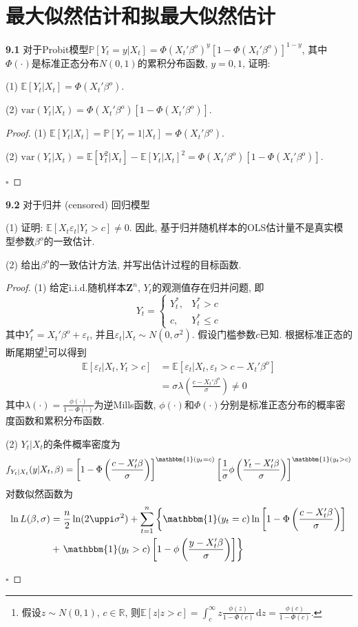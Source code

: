 \documentclass[cn,12pt,math=mtpro2,citestyle=gb7714-2015,bibstyle=gb7714-2015,twocol,mode=simple]{elegantbook}
\newcommand{\R}{\mathbb{R}}
\newcommand{\PP}{\mathbb{P}}
\newcommand{\E}{\mathbb{E}}
\newcommand{\var}{\text{var}}
\begin{document}
\chapter*{最大似然估计和拟最大似然估计}
\textbf{9.1} 对于Probit模型$\PP[Y_t=y|X_t]=\Phi(X_t'\beta^o)^y[1-\Phi(X_t'\beta^o)]^{1-y}$, 其中$\Phi(\cdot)$是标准正态分布$N(0,1)$的累积分布函数, $y=0,1$, 证明:

(1) $\E[Y_t|X_t]=\Phi(X_t'\beta^o)$.

(2) $\var(Y_t|X_t)=\Phi(X_t'\beta^o)[1-\Phi(X_t'\beta^o)]$.
\begin{proof}
  (1) $\E[Y_t|X_t]=\PP[Y_t=1|X_t]=\Phi(X_t'\beta^o)$.

  (2) $\var(Y_t|X_t)=\E[Y_t^2|X_t]-\E[Y_t|X_t]^2=\Phi(X_t'\beta^o)[1-\Phi(X_t'\beta^o)]$.

  $\square$
\end{proof}

\textbf{9.2} 对于归并 (censored) 回归模型

(1) 证明: $\E[X_t\varepsilon_t|Y_t>c]\neq0$. 因此, 基于归并随机样本的OLS估计量不是真实模型参数$\beta^o$的一致估计.

(2) 给出$\beta^o$的一致估计方法, 并写出估计过程的目标函数.

\begin{proof}
  (1) 给定i.i.d.随机样本$\mathbf{Z}^n$, $Y_t$的观测值存在归并问题, 即
  $$Y_t=\begin{cases}
          Y_t^\ast, & Y^\ast_t>c \\
          c, & Y^\ast_t\leq c
        \end{cases}$$
  其中$Y_t^\ast=X_t'\beta^o+\varepsilon_t$, 并且$\varepsilon_t|X_t\sim N(0,\sigma^2)$. 假设门槛参数$c$已知. 根据标准正态的断尾期望\footnote{假设$z\sim N(0,1)$, $c\in\R$, 则$\displaystyle\E[z|z>c]=\int_{c}^{\infty}z\frac{\phi(z)}{1-\Phi(c)}\,\text{d}z=\frac{\phi(c)}{1-\Phi(c)}$.}可以得到
  \begin{align*}
  \E[\varepsilon_t|X_t,Y_t>c]&=\E[\varepsilon_t|X_t,\varepsilon_t>c-X_t'\beta^o] \\
  &=\sigma\lambda\left(\frac{c-X_t'\beta^o}{\sigma}\right)\neq0
  \end{align*}
  其中$\displaystyle \lambda(\cdot)=\frac{\phi(\cdot)}{1-\Phi(\cdot)}$为逆Mills函数, $\phi(\cdot)$和$\Phi(\cdot)$分别是标准正态分布的概率密度函数和累积分布函数.

  (2) $Y_t|X_t$的条件概率密度为
  $$f_{Y_t|X_t}(y|X_t,\beta)=\left[1-\Phi\left(\frac{c-X_t'\beta}{\sigma}\right)\right]^{\mathbbm{1}(y_t=c)}\left[\frac{1}{\sigma}\phi\left(\frac{Y_t-X_t'\beta}{\sigma}\right)\right]^{\mathbbm{1}(y_t>c)}$$
  对数似然函数为
  \begin{align*}
  \ln L(\beta,\sigma)&=\frac{n}{2}\ln(2\uppi\sigma^2)+\sum_{t=1}^{n}\left\{\mathbbm{1}(y_t=c)\ln\left[1-\Phi\left(\frac{c-X_t'\beta}{\sigma}\right)\right]\right. \\
  &+\left.\mathbbm{1}(y_t>c)\left[1-\phi\left(\frac{y-X_t'\beta}{\sigma}\right)\right]\right\}
  \end{align*}

$\square$

\end{proof}
\end{document}
